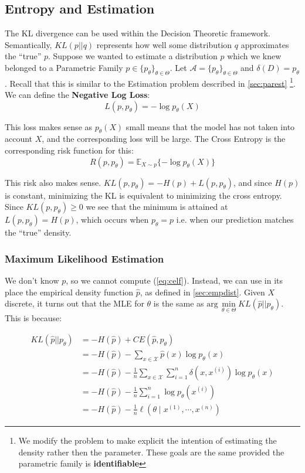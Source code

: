 \documentclass[]{article}
\theoremstyle{mattstyle}
\theoremstyle{definition}
\begin{document}
\subsection{Entropy and Estimation}

The KL divergence can be used within the Decision Theoretic framework. Semantically, $KL(p||q)$ represents how well some distribution $q$ approximates the ``true'' $p$. Suppose we wanted to estimate a distribution $p$ which we knew belonged to a Parametric Family  $p\in \{p_{\theta}\}_{\theta\in\Theta}$. Let \(\mathcal{A} = \{p_{\theta}\}_{\theta\in\Theta}\) and $\delta(D)=p_{\theta}$. Recall that this is similar to the Estimation problem described in \ref{sec:parest} \footnote{We modify the problem to make explicit the intention of estimating the density rather then the parameter. These goals are the same provided the parametric family is \textbf{identifiable}}.  We can define the \textbf{Negative Log Loss}:
\begin{equation}
L(p,p_{\theta}) = -\log p_{\theta}(X)
\end{equation}

This loss makes sense as $p_{\theta}(X)$ small means that the model has not taken into account $X$, and the corresponding loss will be large. The Cross Entropy is the corresponding risk function for this:
\begin{equation}\label{eq:celf}
R(p,p_{\theta}) = \mathbb{E}_{X\sim p}\{ -\log p_{\theta}(X) \}
\end{equation}	

This risk also makes sense. $KL(p,p_{\theta}) = -H(p) + L(p,p_{\theta})$, and since $H(p)$ is constant, minimizing the KL is equivalent to minimizing the cross entropy. Since $KL(p,p_{\theta}) \ge 0$ we see that the minimum is attained at $L(p,p_{\theta}) = H(p)$, which occurs when $p_{\theta}=p$ i.e. when our prediction matches the ``true'' density.

\subsubsection{Maximum Likelihood Estimation}

We don't know $p$, so we cannot compute (\ref{eq:celf}). Instead, we can use in its place the empirical density function $\hat{p}$, as defined in \ref{sec:empdist}. Given $X$ discrete, it turns out that the MLE for $\theta$ is the same as $\text{arg}\,\min\limits_{\theta\in\Theta} KL(\hat{p}||p_{\theta})$. This is because:

\begin{align*}
KL(\hat{p}||p_{\theta}) &= -H(\hat{p}) + CE(\hat{p},p_{\theta}) \\
&= -H(\hat{p}) - \sum_{x\in\mathcal{X}}\hat{p}(x)\log p_{\theta}(x)\\
&= -H(\hat{p}) - \frac{1}{n}\sum_{x\in\mathcal{X}}\sum_{i=1}^n\delta(x,x^{(i)}) \log p_{\theta}(x)\\
&= -H(\hat{p}) - \frac{1}{n}\sum_{i=1}^n\log p_{\theta}(x^{(i)})\\
&= -H(\hat{p}) - \frac{1}{n}\ell(\theta \mid x^{(1)}, \cdots, x^{(n)})
\end{align*}
\end{document}
